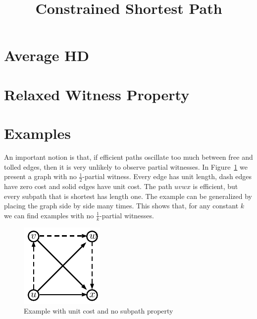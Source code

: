 \documentclass[letterpaper,11pt]{article}
\title{\vspace{-1cm} \bf Constrained Shortest Path \vspace{-1.3cm}}
\author{}
\begin{document}
\maketitle


\section{Average HD}\label{sec:avg_hd}



\section{Relaxed Witness Property}\label{sec:rel_witness}



\section{Examples}

An important notion is that, if efficient paths oscillate too much between free and tolled edges, then it is very unlikely to observe partial witnesses.
In Figure~\ref{fig:nosubpath} we present a graph with no $\frac{1}{2}$-partial witness.
Every edge has unit length, dash edges have zero cost and solid edges have unit cost.
The path $uvwx$ is efficient, but every subpath that is shortest has length one.
The example can be generalized by placing the graph side by side many times.
This shows that, for any constant $k$ we can find examples with no $\frac{1}{k}$-partial witnesses.


\begin{figure}
\caption{Example with unit cost and no subpath property}
\label{fig:nosubpath}
\centering
\includegraphics[scale=1.3]{TexImg/Nosubpath.pdf}
\end{figure}



\end{document}
